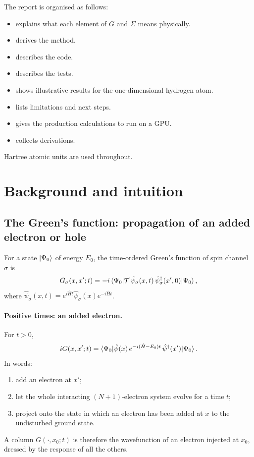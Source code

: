 \documentclass[11pt,a4paper]{article}
\begin{document}
The report is organised as follows:
\begin{itemize}
\item {} explains what each element of $G$ and $\Sigma$ means physically.
\item {} derives the method.
\item {} describes the code.
\item {} describes the tests.
\item {} shows illustrative results for the one-dimensional hydrogen atom.
\item {} lists limitations and next steps.
\item {} gives the production calculations to run on a GPU.
\item {} collects derivations.
\end{itemize}

Hartree atomic units are used throughout.

\section{Background and intuition}
\label{sec:background}

\subsection{The Green's function: propagation of an added electron or hole}

For a state $\ket{\Psi_0}$ of energy $E_0$, the time-ordered Green's function of spin channel $\sigma$ is
\begin{equation}
G_\sigma(x,x';t) = -i\braket{\Psi_0|\mathcal{T}\,\hat\psi_\sigma(x,t)\,\hat\psi_\sigma^\dagger(x',0)|\Psi_0},
\label{eq:G}
\end{equation}
where $\hat\psi_\sigma(x,t) = e^{i\hat Ht}\hat\psi_\sigma(x)e^{-i\hat Ht}$.

\paragraph{Positive times: an added electron.} For $t>0$,
\begin{equation}
iG(x,x';t) = \braket{\Psi_0|\hat\psi(x)\,e^{-i(\hat H-E_0)t}\,\hat\psi^\dagger(x')|\Psi_0}.
\end{equation}
In words:
\begin{enumerate}
\item add an electron at $x'$;
\item let the whole interacting $(N+1)$-electron system evolve for a time $t$;
\item project onto the state in which an electron has been added at $x$ to the undisturbed ground state.
\end{enumerate}
A column $G(\cdot,x_0;t)$ is therefore the wavefunction of an electron injected at $x_0$, dressed by the response of all the others.
\end{document}
